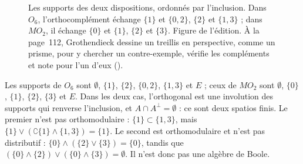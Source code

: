 \begin{figure}[htbp]
\centering
{}
\caption{Les supports des deux dispositions, ordonnés par l'inclusion. Dans $O_6$, l'orthocomplément échange $\{1\}$ et $\{0,2\}$, $\{2\}$ et $\{1,3\}$ ; dans $MO_2$, il échange $\{0\}$ et $\{1\}$, $\{2\}$ et $\{3\}$. Figure de l'édition. À la page~112, Grothendieck dessine un treillis en perspective, comme un prisme, pour y chercher un contre-exemple, vérifie les compléments et note  pour l'un d'eux ().}
\label{fig:156-9-spatios}
\end{figure}

\begin{encadre}
\begin{contrexemple}
Les supports de $O_6$ sont $\emptyset$, $\{1\}$, $\{2\}$, $\{0,2\}$, $\{1,3\}$ et $E$ ; ceux de $MO_2$ sont $\emptyset$, $\{0\}$, $\{1\}$, $\{2\}$, $\{3\}$ et $E$. Dans les deux cas, l'orthogonal est une involution des supports qui renverse l'inclusion, et $A \cap A^{\perp} = \emptyset$ : ce sont deux spatios finis. Le premier n'est pas orthomodulaire : $\{1\} \subset \{1,3\}$, mais $\{1\} \vee (\complement\{1\} \wedge \{1,3\}) = \{1\}$. Le second est orthomodulaire et n'est pas distributif : $\{0\} \wedge (\{2\} \vee \{3\}) = \{0\}$, tandis que $(\{0\} \wedge \{2\}) \vee (\{0\} \wedge \{3\}) = \emptyset$. Il n'est donc pas une algèbre de Boole.
\end{contrexemple}
\end{encadre}

